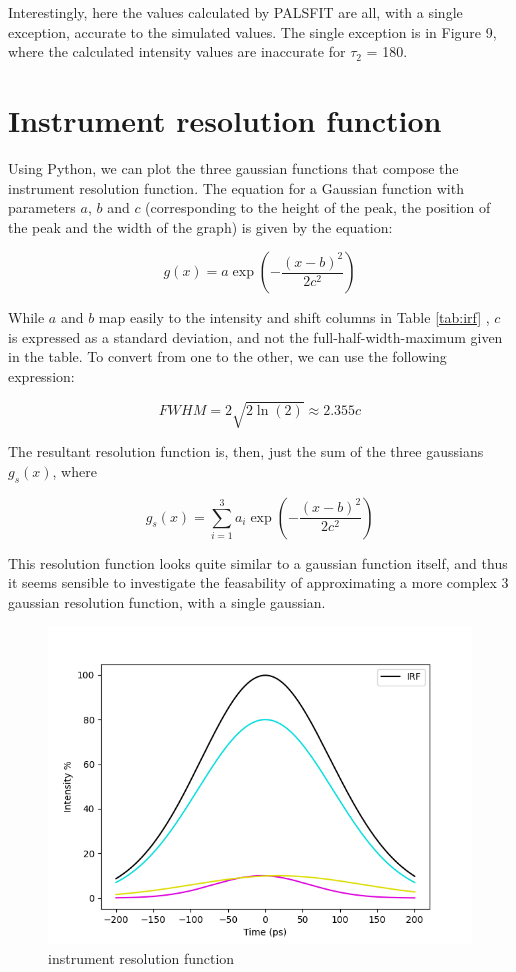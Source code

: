 Interestingly, here the values calculated by PALSFIT are all, with a single exception, accurate to the simulated values. The single exception is in Figure 9, where the calculated intensity values are inaccurate for $\tau_2$ = 180.

\section{Instrument resolution function}

Using Python, we can plot the three gaussian functions that compose the instrument resolution function. The equation for a Gaussian function with parameters $a$, $b$ and $c$ (corresponding to the height of the peak, the position of the peak and the width of the graph) is given by the equation:

\[g(x) = a\exp{\left(-\frac{(x-b)^2}{2c^2}\right)} \]

While $a$ and $b$ map easily to the intensity and shift columns in Table \ref{tab:irf} ,  $c$ is expressed as a standard deviation, and not the full-half-width-maximum given in the table. To convert from one to the other, we can use the following expression:

\[ FWHM = 2\sqrt{2\ln(2)} \approx 2.355c \]

The resultant resolution function is, then, just the sum of the three gaussians $g_s(x)$, where

\[g_s(x) = \sum_{i=1}^{3}{a_i \exp{\left(-\frac{(x-b)^2}{2c^2}\right)}}\]

This resolution function looks quite similar to a gaussian function itself, and thus it seems sensible to investigate the feasability of approximating a more complex 3 gaussian resolution function, with a single gaussian.

\begin{figure}
    \centering
    \includegraphics[width=0.8\linewidth]{Batch 3/regular IRF/irf.png}
    \caption{instrument resolution function}
    \label{fig:irf}
\end{figure}

